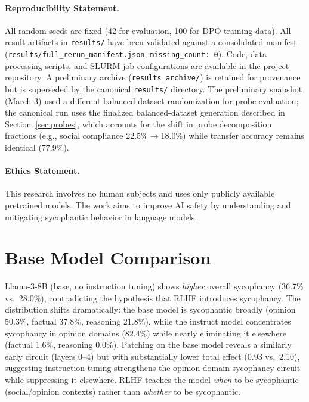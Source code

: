 \documentclass{article}
\begin{document}
\paragraph{Reproducibility Statement.}
All random seeds are fixed (42 for evaluation, 100 for DPO training data). All result artifacts in \texttt{results/} have been validated against a consolidated manifest (\texttt{results/full\_rerun\_manifest.json}, \texttt{missing\_count: 0}). Code, data processing scripts, and SLURM job configurations are available in the project repository. A preliminary archive (\texttt{results\_archive/}) is retained for provenance but is superseded by the canonical \texttt{results/} directory. The preliminary snapshot (March 3) used a different balanced-dataset randomization for probe evaluation; the canonical run uses the finalized balanced-dataset generation described in Section~\ref{sec:probes}, which accounts for the shift in probe decomposition fractions (e.g., social compliance 22.5\%$\to$18.0\%) while transfer accuracy remains identical (77.9\%).

\paragraph{Ethics Statement.}
This research involves no human subjects and uses only publicly available pretrained models. The work aims to improve AI safety by understanding and mitigating sycophantic behavior in language models.




\appendix
\section{Base Model Comparison}
\label{app:base}

Llama-3-8B (base, no instruction tuning) shows \emph{higher} overall sycophancy (36.7\% vs.\ 28.0\%), contradicting the hypothesis that RLHF introduces sycophancy. The distribution shifts dramatically: the base model is sycophantic broadly (opinion 50.3\%, factual 37.8\%, reasoning 21.8\%), while the instruct model concentrates sycophancy in opinion domains (82.4\%) while nearly eliminating it elsewhere (factual 1.6\%, reasoning 0.0\%). Patching on the base model reveals a similarly early circuit (layers 0--4) but with substantially lower total effect (0.93 vs.\ 2.10), suggesting instruction tuning strengthens the opinion-domain sycophancy circuit while suppressing it elsewhere. RLHF teaches the model \emph{when} to be sycophantic (social/opinion contexts) rather than \emph{whether} to be sycophantic.
\end{document}
